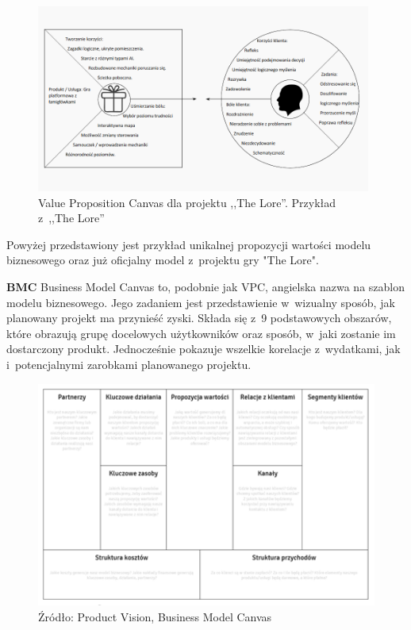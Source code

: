 \documentclass[oneside,polski,logo]{amuthesis}
\begin{document}
\begin{figure}[h]
	\centering
	\includegraphics[width=11cm]{images/hyps/VPC-The Lore.png}
	\caption{Value Proposition Canvas dla projektu ,,The Lore''. Przykład z~,,The Lore''}
\end{figure}

Powyżej przedstawiony jest przykład unikalnej propozycji wartości modelu biznesowego oraz już oficjalny model z~projektu gry "The Lore".

\textbf{BMC}
Business Model Canvas to, podobnie jak VPC, angielska nazwa na szablon modelu biznesowego. Jego zadaniem jest przedstawienie w~wizualny sposób, jak planowany projekt ma przynieść zyski. Składa się z~9 podstawowych obszarów, które obrazują grupę docelowych użytkowników oraz sposób, w~jaki zostanie im dostarczony produkt. Jednocześnie pokazuje wszelkie korelacje z~wydatkami, jak i~potencjalnymi zarobkami planowanego projektu. \cite{BMC}

\begin{figure}[h]
	\centering
	\includegraphics[width=15cm]{images/hyps/BMC.png}
	\caption{Źródło: Product Vision, Business Model Canvas}
\end{figure}
\end{document}
